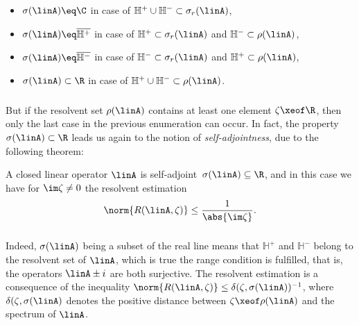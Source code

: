 \documentclass[11pt,twoside]{article}
\begin{document}
\begin{itemize}[leftmargin=20pt,itemsep=2pt]
\item[1.]
$\sigma(\linA) \eq \C$
in case of $\mathbb{H}^+ \cup \mathbb{H}^- \subset \sigma_r(\linA)$,
\item[2.]
$\sigma(\linA) \eq \overline{\mathbb{H}^+}$
in case of $\mathbb{H}^+ \subset \sigma_r(\linA)$ and
$\mathbb{H}^- \subset \rho(\linA)$,
\item[3.]
$\sigma(\linA) \eq \overline{\mathbb{H}^-}$
in case of $\mathbb{H}^- \subset \sigma_r(\linA)$ and
$\mathbb{H}^+ \subset \rho(\linA)$,
\item[4.]
$\sigma(\linA) \subset \R$
in case of $\mathbb{H}^+ \cup \mathbb{H}^- \subset \rho(\linA)$.
\end{itemize}

\subparagraph{}
But if the resolvent set $\rho(\linA)$ contains at least
one element $\zeta \xeof \R$,
then only the last case in the previous enumeration can occur.
In fact,
the property $\sigma(\linA) \subset \R$ leads us again
to the notion of \textit{self-adjointness},
due to the following theorem:

\begin{theorem1}\label{CRITERION_FOR_SELF-ADJOINTNESS}
A closed linear operator $\linA$ is self-adjoint \iff
\,$\sigma(\linA) \subseteq \R$,
and in this case we have for $\im \zeta \neq 0$ the resolvent estimation
\[
\norm{R(\linA,\zeta)} \leq \frac{1}{\abs{\im \zeta} }.
\]
\end{theorem1}

\subparagraph{}
Indeed,
$\sigma(\linA)$ being a subset of the real line means that
$\mathbb{H}^+$ and $\mathbb{H}^-$ belong to the resolvent set of $\linA$,
which is true \iff the range condition is fulfilled,
that is, 
the operators $\linA \pm i$ are both surjective.
The resolvent estimation is a consequence of the inequality
$\norm{R(\linA,\zeta)} \leq \delta(\zeta,\sigma(\linA))^{-1}$,
where $\delta(\zeta,\sigma(\linA)$ denotes the positive distance between 
$\zeta \xeof \rho(\linA)$ and the spectrum of $\linA$.
\end{document}

